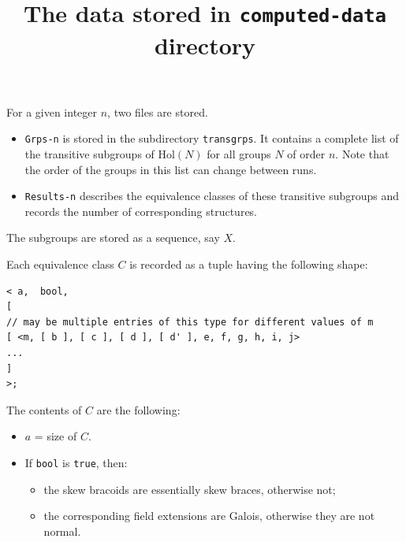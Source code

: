 \documentclass[a4paper,11pt]{article}
\title{The data stored in \texttt{computed-data} directory}
\date{}
\begin{document}
	
	\maketitle
	
	For a given integer $n$, two files are stored.
	\begin{itemize}
		\item \texttt{Grps-n} is stored in the subdirectory 
\texttt{transgrps}. It contains a
		complete list of the transitive subgroups of $\mathrm{Hol}(N)$ for all groups $N$
		of order $n$. Note that the order of the groups in this list can change between runs.
		
\item \texttt{Results-n} describes the equivalence
classes of these transitive subgroups and records the number of corresponding
		structures.
	\end{itemize}
	
	The subgroups are stored as a sequence, say $X$.
	
	Each equivalence class $C$ is recorded as a tuple having the following shape:
	
\begin{lstlisting}
< a,  bool,
[
// may be multiple entries of this type for different values of m
[ <m, [ b ], [ c ], [ d ], [ d' ], e, f, g, h, i, j>
...
] 
>;
\end{lstlisting}
	
	The contents of $C$ are the following:
	
	\begin{itemize}
		\item $a$ = size of $C$.
		
		\item If \texttt{bool} is \texttt{true}, then:
		\begin{itemize}
			\item the skew bracoids are essentially skew braces, otherwise not;
			\item the corresponding field extensions are Galois, otherwise they are
			not normal.
		\end{itemize}
	\end{itemize}
	
\end{document}
